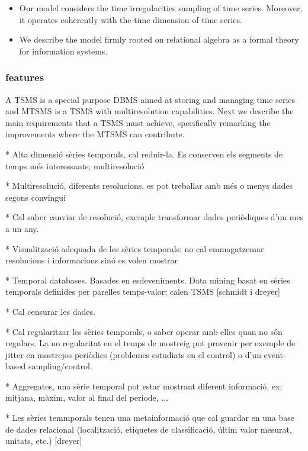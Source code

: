 \begin{itemize}
\item Our model considers the time irregularities sampling of time
  series. Moreover, it operates coherently with the time dimension of
  time series.

\item We describe the model firmly rooted on relational algebra as a formal
  theory for information systems.

\end{itemize}



\subsubsection{features}

A TSMS is a special purpose DBMS aimed at storing and managing time
series and MTSMS is a TSMS with multiresolution capabilities. Next we
describe the main requirements that a TSMS must achieve, specifically
remarking the improvements where the MTSMS can contribute.



* Alta dimensió sèries temporals, cal reduir-la. Es conserven els segments de temps més interessants; multiresolució


* Multiresolució, diferents resolucions, es pot treballar amb més o menys dades segons convingui

* Cal saber canviar de resolució, exemple transformar dades periòdiques d'un mes a un any.

* Visualització adequada de les sèries temporals: no cal emmagatzemar resolucions i informacions sinó es volen mostrar


* Temporal databases. Basades en esdeveniments. Data mining basat en sèries temporals definides per parelles temps-valor; calen TSMS [schmidt i dreyer] 



* Cal censurar les dades.

* Cal regularitzar les sèries temporals, o saber operar amb elles quan no són regulars. La no regularitat en el temps de mostreig pot provenir per exemple de jitter en mostrejos periòdics (problemes estudiats en el control) o d'un event-based sampling/control.


* Aggregates, una sèrie temporal pot estar mostrant diferent informació. ex: mitjana, màxim, valor al final del període, ...

* Les sèries temmporals tenen una metainformació que cal guardar en una base de dades relacional (localització, etiquetes de classificació, últim valor mesurat, unitats, etc.) [dreyer]



